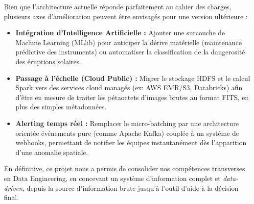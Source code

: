 \documentclass[11pt,a4paper]{article}
\begin{document}
Bien que l'architecture actuelle réponde parfaitement au cahier des charges, plusieurs axes d'amélioration peuvent être envisagés pour une version ultérieure :
\begin{itemize}
    \item \textbf{Intégration d'Intelligence Artificielle :} Ajouter une surcouche de Machine Learning (MLlib) pour anticiper la dérive matérielle (maintenance prédictive des instruments) ou automatiser la classification de la dangerosité des éruptions solaires.
    \item \textbf{Passage à l'échelle (Cloud Public) :} Migrer le stockage HDFS et le calcul Spark vers des services cloud managés (ex: AWS EMR/S3, Databricks) afin d'être en mesure de traiter les pétaoctets d'images brutes au format FITS, en plus des simples métadonnées.
    \item \textbf{Alerting temps réel :} Remplacer le micro-batching par une architecture orientée événements pure (comme Apache Kafka) couplée à un système de webhooks, permettant de notifier les équipes instantanément dès l'apparition d'une anomalie spatiale.
\end{itemize}

En définitive, ce projet nous a permis de consolider nos compétences transverses en Data Engineering, en concevant un système d'information complet et \textit{data-driven}, depuis la source d'information brute jusqu'à l'outil d'aide à la décision final.

\newpage
\thispagestyle{empty}
\vspace*{\fill}
\end{document}
